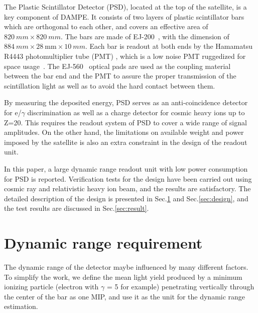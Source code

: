 \documentclass[preprint, times]{elsarticle}
\begin{document}
The Plastic Scintillator Detector (PSD), located at the top of the satellite, is a key component of DAMPE. 
It consists of two layers of plastic scintillator bars which are orthogonal to each other, and covers an effective area of
$\SI{820}{mm}\times\SI{820}{mm}$. 
The bars are made of EJ-200~\cite{scintillator}, with the dimension of $\SI{884}{mm} \times \SI{28}{\milli\meter} \times \SI{10}{mm}$.
Each bar  is readout at both ends by the Hamamatsu R4443 photomultiplier tube (PMT) , which is a low noise PMT ruggedized for space usage~\cite{r4443}. 
The EJ-560~\cite{scintillator} optical pads are used as the  coupling material between the bar end and the PMT to assure the proper transmission of the scintillation light as well as to avoid the hard contact between them.

By measuring the deposited energy, PSD serves as an anti-coincidence detector for e/$\gamma$ discrimination as well as a charge detector for cosmic heavy ions up to Z=20.
This requires the readout system of PSD to cover a wide range of signal amplitudes. 
On the other hand, the limitations on available weight and power imposed by the satellite is also an
extra constraint in the design of the readout unit.

In this paper, a large dynamic range readout unit with low power consumption for PSD is reported.
Verification tests for the design have been carried out using cosmic ray and relativistic heavy ion beam, and the results are satisfactory.
The detailed description of the design is presented in Sec.\ref{sec:requirement} and Sec.\ref{sec:design}, and the test results are discussed in Sec.\ref{sec:result}.

\section{Dynamic range requirement}
\label{sec:requirement}

The dynamic range of the detector maybe influenced by many different factors. To simplify the work, we define the mean light yield produced by a minimum ionizing particle (electron with $\gamma$ = 5 for example) penetrating vertically through the center of the bar as one MIP, and use it as the unit for the dynamic range estimation.
\end{document}
